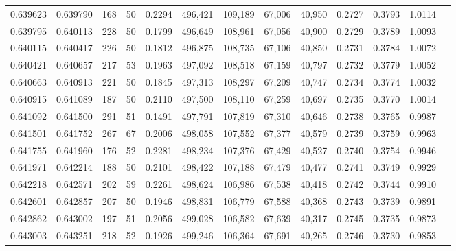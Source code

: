 \begin{tabular}{rrrrrrrrrrrrr}
0.639623 & 0.639790 &   168 &  50 &                                     0.2294 & 496,421 & 109,189 &  67,006 &  40,950 & 0.2727 & 0.3793 & 1.0114 \\
0.639795 & 0.640113 &   228 &  50 &                                     0.1799 & 496,649 & 108,961 &  67,056 &  40,900 & 0.2729 & 0.3789 & 1.0093 \\
0.640115 & 0.640417 &   226 &  50 &                                     0.1812 & 496,875 & 108,735 &  67,106 &  40,850 & 0.2731 & 0.3784 & 1.0072 \\
0.640421 & 0.640657 &   217 &  53 &                                     0.1963 & 497,092 & 108,518 &  67,159 &  40,797 & 0.2732 & 0.3779 & 1.0052 \\
0.640663 & 0.640913 &   221 &  50 &                                     0.1845 & 497,313 & 108,297 &  67,209 &  40,747 & 0.2734 & 0.3774 & 1.0032 \\
0.640915 & 0.641089 &   187 &  50 &                                     0.2110 & 497,500 & 108,110 &  67,259 &  40,697 & 0.2735 & 0.3770 & 1.0014 \\
0.641092 & 0.641500 &   291 &  51 &                                     0.1491 & 497,791 & 107,819 &  67,310 &  40,646 & 0.2738 & 0.3765 & 0.9987 \\
0.641501 & 0.641752 &   267 &  67 &                                     0.2006 & 498,058 & 107,552 &  67,377 &  40,579 & 0.2739 & 0.3759 & 0.9963 \\
0.641755 & 0.641960 &   176 &  52 &                                     0.2281 & 498,234 & 107,376 &  67,429 &  40,527 & 0.2740 & 0.3754 & 0.9946 \\
0.641971 & 0.642214 &   188 &  50 &                                     0.2101 & 498,422 & 107,188 &  67,479 &  40,477 & 0.2741 & 0.3749 & 0.9929 \\
0.642218 & 0.642571 &   202 &  59 &                                     0.2261 & 498,624 & 106,986 &  67,538 &  40,418 & 0.2742 & 0.3744 & 0.9910 \\
0.642601 & 0.642857 &   207 &  50 &                                     0.1946 & 498,831 & 106,779 &  67,588 &  40,368 & 0.2743 & 0.3739 & 0.9891 \\
0.642862 & 0.643002 &   197 &  51 &                                     0.2056 & 499,028 & 106,582 &  67,639 &  40,317 & 0.2745 & 0.3735 & 0.9873 \\
0.643003 & 0.643251 &   218 &  52 &                                     0.1926 & 499,246 & 106,364 &  67,691 &  40,265 & 0.2746 & 0.3730 & 0.9853 \\

\end{tabular}
